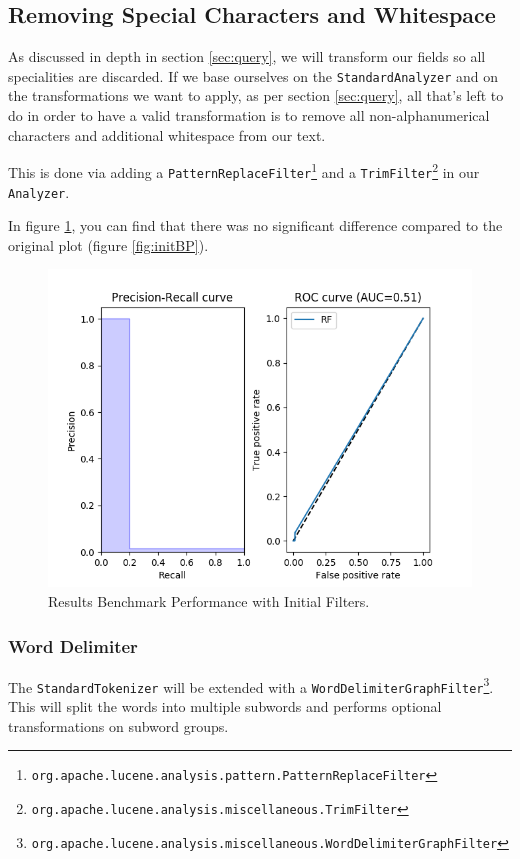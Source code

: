 \documentclass[11pt]{article}
\begin{document}
\subsection{Removing Special Characters and Whitespace}
As discussed in depth in section \ref{sec:query}, we will transform our fields so all specialities are discarded. If we base ourselves on the \texttt{StandardAnalyzer} and on the transformations we want to apply, as per section \ref{sec:query}, all that's left to do in order to have a valid transformation is to remove all non-alphanumerical characters and additional whitespace from our text.

This is done via adding a \texttt{PatternReplaceFilter}\footnote{\texttt{org.apache.lucene.analysis.pattern.PatternReplaceFilter}} and a \texttt{TrimFilter}\footnote{\texttt{org.apache.lucene.analysis.miscellaneous.TrimFilter}} in our \texttt{Analyzer}.

In figure \ref{fig:alphanumeric}, you can find that there was no significant difference compared to the original plot (figure \ref{fig:initBP}).
\begin{figure}[htp]
    \centering
    \includegraphics[width=\textwidth]{images/customAna-trim}
    \caption{Results Benchmark Performance with Initial Filters.}
    \label{fig:alphanumeric}
\end{figure}

\subsubsection{Word Delimiter}\label{sec:word-delimiter}
The \texttt{StandardTokenizer} will be extended with a \texttt{WordDelimiterGraphFilter}\footnote{\texttt{org.apache.lucene.analysis.miscellaneous.WordDelimiterGraphFilter}}. This will split the words into multiple subwords and performs optional transformations on subword groups. \cite{lucene}
\end{document}
